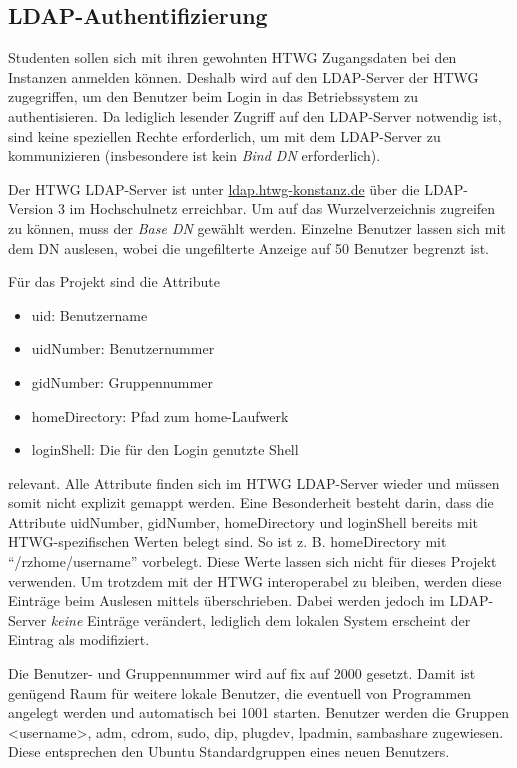 \subsection{LDAP-Authentifizierung}

Studenten sollen sich mit ihren gewohnten HTWG Zugangsdaten bei den Instanzen anmelden können. 
Deshalb wird auf den LDAP-Server der HTWG zugegriffen, um den Benutzer beim Login in das Betriebssystem zu authentisieren. 
Da lediglich lesender Zugriff auf den LDAP-Server notwendig ist, sind keine speziellen Rechte erforderlich, um  mit dem LDAP-Server zu kommunizieren (insbesondere ist kein \emph{Bind DN} erforderlich).

Der HTWG LDAP-Server ist unter \url{ldap.htwg-konstanz.de} über die LDAP-Version 3 im Hochschulnetz erreichbar. 
Um auf das Wurzelverzeichnis zugreifen zu können, muss der \emph{Base DN}  gewählt werden. 
Einzelne Benutzer lassen sich mit dem DN  auslesen, wobei die ungefilterte Anzeige auf 50 Benutzer begrenzt ist. 

Für das Projekt sind die Attribute

\begin{itemize}
\item uid: Benutzername
\item uidNumber: Benutzernummer
\item gidNumber: Gruppennummer
\item homeDirectory: Pfad zum home-Laufwerk
\item loginShell: Die für den Login genutzte Shell
\end{itemize}

relevant. Alle Attribute finden sich im HTWG LDAP-Server wieder und müssen somit nicht explizit gemappt werden. 
Eine Besonderheit besteht darin, dass die Attribute uidNumber, gidNumber, homeDirectory und loginShell bereits mit HTWG-spezifischen Werten belegt sind. 
So ist z. B. homeDirectory mit \enquote{/rzhome/username} vorbelegt.
Diese Werte lassen sich nicht für dieses Projekt verwenden.
Um trotzdem mit der HTWG interoperabel zu bleiben, werden diese Einträge beim Auslesen mittels  überschrieben. 
Dabei werden jedoch im LDAP-Server \emph{keine} Einträge verändert, lediglich dem lokalen System erscheint der Eintrag als modifiziert.

Die Benutzer- und Gruppennummer wird auf fix auf 2000 gesetzt.
Damit ist genügend Raum für weitere lokale Benutzer, die eventuell von Programmen angelegt werden und automatisch bei 1001 starten.
Benutzer werden die Gruppen <username>, adm, cdrom, sudo, dip, plugdev, lpadmin, sambashare zugewiesen. 
Diese entsprechen den Ubuntu Standardgruppen eines neuen Benutzers.

